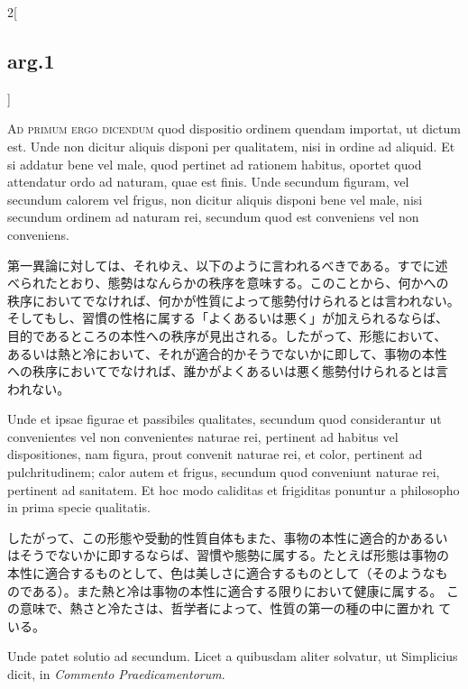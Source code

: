 \documentclass[paper=a4paper,fontsize=10pt,jafontsize=9pt,titlepage]{jlreq}
\begin{document}
\begin{paracol}{2}[\subsection{arg.1}]
\switchcolumn*[\subsection{ad.1}]

{\scshape Ad primum ergo dicendum} quod dispositio ordinem quendam importat, ut
dictum est. Unde non dicitur aliquis disponi per qualitatem, nisi in
ordine ad aliquid. Et si addatur bene vel male, quod pertinet ad
rationem habitus, oportet quod attendatur ordo ad naturam, quae est
finis. Unde secundum figuram, vel secundum calorem vel frigus, non
dicitur aliquis disponi bene vel male, nisi secundum ordinem ad
naturam rei, secundum quod est conveniens vel non conveniens.

\switchcolumn

第一異論に対しては、それゆえ、以下のように言われるべきである。すでに述
べられたとおり、態勢はなんらかの秩序を意味する。このことから、何かへの
秩序においてでなければ、何かが性質によって態勢付けられるとは言われない。
そしてもし、習慣の性格に属する「よくあるいは悪く」が加えられるならば、
目的であるところの本性への秩序が見出される。したがって、形態において、
あるいは熱と冷において、それが適合的かそうでないかに即して、事物の本性
への秩序においてでなければ、誰かがよくあるいは悪く態勢付けられるとは言
われない。

\switchcolumn*

Unde et
ipsae figurae et passibiles qualitates, secundum quod considerantur ut
convenientes vel non convenientes naturae rei, pertinent ad habitus
vel dispositiones, nam figura, prout convenit naturae rei, et color,
pertinent ad pulchritudinem; calor autem et frigus, secundum quod
conveniunt naturae rei, pertinent ad sanitatem. Et hoc modo caliditas
et frigiditas ponuntur a philosopho in prima specie qualitatis.

\switchcolumn

したがって、この形態や受動的性質自体もまた、事物の本性に適合的かあるい
はそうでないかに即するならば、習慣や態勢に属する。たとえば形態は事物の
本性に適合するものとして、色は美しさに適合するものとして（そのようなも
のである）。また熱と冷は事物の本性に適合する限りにおいて健康に属する。
この意味で、熱さと冷たさは、哲学者によって、性質の第一の種の中に置かれ
ている。

\switchcolumn*

Unde patet solutio ad secundum. Licet a quibusdam aliter solvatur, ut
Simplicius dicit, in {\itshape Commento Praedicamentorum}.

\switchcolumn


\end{paracol}
\end{document}
